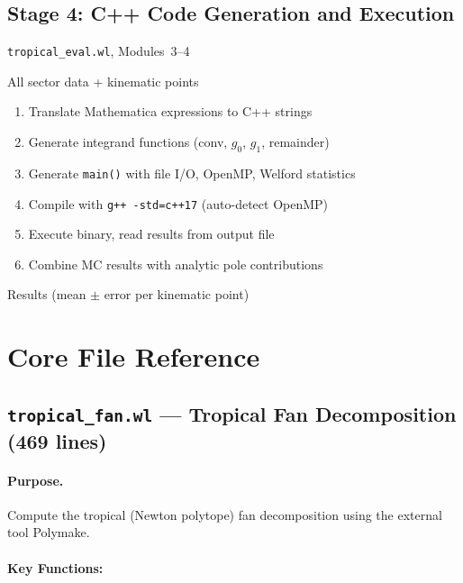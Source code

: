\documentclass[11pt,a4paper]{article}
\begin{document}
\subsection{Stage 4: C++ Code Generation and Execution}
\begin{description}[style=nextline]
  \item[Source:] \texttt{tropical\_eval.wl}, Modules~3--4
  \item[Input:] All sector data + kinematic points
  \item[Process:]
    \begin{enumerate}[label=(\alph*)]
      \item Translate Mathematica expressions to C++ strings
      \item Generate integrand functions (conv, $g_0$, $g_1$, remainder)
      \item Generate \texttt{main()} with file I/O, OpenMP, Welford statistics
      \item Compile with \texttt{g++ -std=c++17} (auto-detect OpenMP)
      \item Execute binary, read results from output file
      \item Combine MC results with analytic pole contributions
    \end{enumerate}
  \item[Output:] Results (mean $\pm$ error per kinematic point)
\end{description}

\section{Core File Reference}

\subsection{\texttt{tropical\_fan.wl} --- Tropical Fan Decomposition (469 lines)}

\paragraph{Purpose.} Compute the tropical (Newton polytope) fan decomposition using the external tool Polymake.

\paragraph{Key Functions:}
\end{document}
